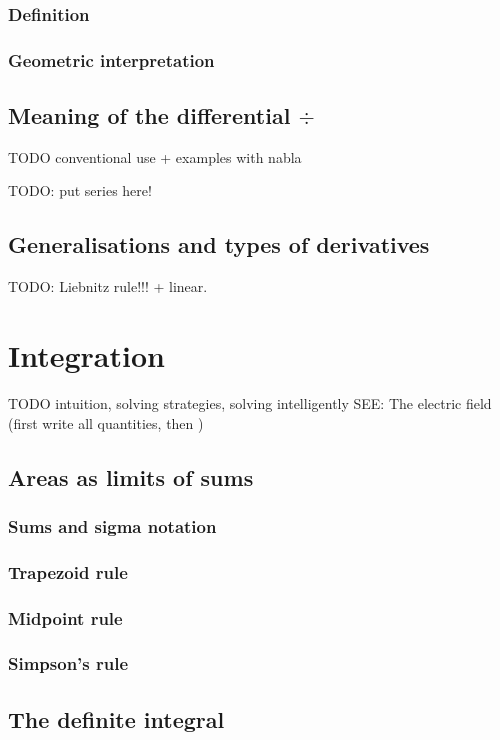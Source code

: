 \subsubsection{Definition}
\subsubsection{Geometric interpretation}

\subsection{Meaning of the differential $\div{}$}
TODO conventional use + examples with nabla

TODO: put series here!

\subsection{Generalisations and types of derivatives}
TODO: Liebnitz rule!!! + linear.

\section{Integration}
TODO intuition, solving strategies, solving intelligently 
SEE: The electric field (first write all quantities, then )

\subsection{Areas as limits of sums}
\subsubsection{Sums and sigma notation}
\subsubsection{Trapezoid rule}
\subsubsection{Midpoint rule}
\subsubsection{Simpson's rule}

\subsection{The definite integral}
